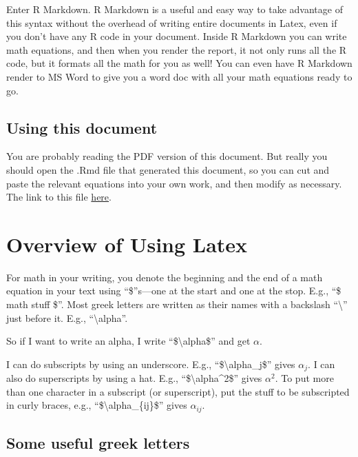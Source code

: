 \documentclass[
  letterpaper,
  DIV=11,
  numbers=noendperiod]{scrreprt}
\begin{document}
Enter R Markdown. R Markdown is a useful and easy way to take advantage
of this syntax without the overhead of writing entire documents in
Latex, even if you don't have any R code in your document. Inside R
Markdown you can write math equations, and then when you render the
report, it not only runs all the R code, but it formats all the math for
you as well! You can even have R Markdown render to MS Word to give you
a word doc with all your math equations ready to go.

\subsection{Using this document}\label{using-this-document}

You are probably reading the PDF version of this document. But really
you should open the .Rmd file that generated this document, so you can
cut and paste the relevant equations into your own work, and then modify
as necessary. The link to this file
\href{https://raw.githubusercontent.com/lmiratrix/MLM/main/math_reference.qmd}{here}.

\section{Overview of Using Latex}\label{overview-of-using-latex}

For math in your writing, you denote the beginning and the end of a math
equation in your text using ``\$''s---one at the start and one at the
stop. E.g., ``\$ math stuff \$''. Most greek letters are written as
their names with a backslash ``\textbackslash{}'' just before it. E.g.,
``\textbackslash alpha''.

So if I want to write an alpha, I write ``\$\textbackslash alpha\$'' and
get \(\alpha\).

I can do subscripts by using an underscore. E.g.,
``\$\textbackslash alpha\_j\$'' gives \(\alpha_j\). I can also do
superscripts by using a hat. E.g., ``\$\textbackslash alpha\^{}2\$''
gives \(\alpha^2\). To put more than one character in a subscript (or
superscript), put the stuff to be subscripted in curly braces, e.g.,
``\$\textbackslash alpha\_\{ij\}\$'' gives \(\alpha_{ij}\).

\newpage

\subsection{Some useful greek letters}\label{some-useful-greek-letters}
\end{document}

